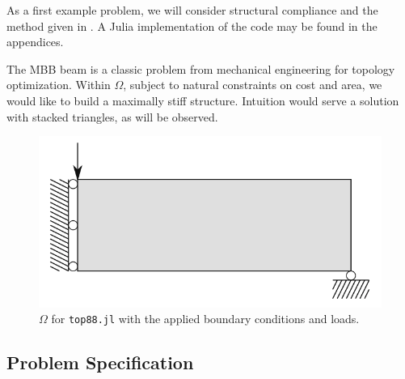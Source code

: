 As a first example problem, we will consider structural compliance and the method given in \cite{andreassen_clausen_schevenels_lazarov_sigmund_2010}.
A Julia implementation of the code may be found in the appendices.

The MBB beam is a classic problem from mechanical engineering for topology optimization. Within $\Omega$,
subject to natural constraints on cost and area, we would like to build a maximally stiff structure.
Intuition would serve a solution with stacked triangles, as will be observed.

\begin{figure}
    \centering
    \caption{$\Omega$ for \texttt{top88.jl} with the applied boundary conditions and loads.}
    \includegraphics[width=\textwidth]{imgs/Top88/problem_diagram.png}
\end{figure}

\subsection{Problem Specification}

